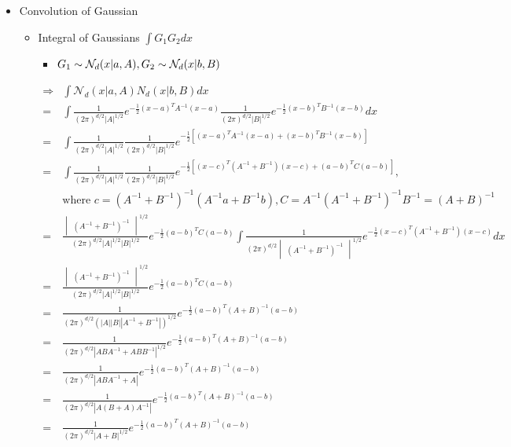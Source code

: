 \begin{itemize}
 	\item Convolution of Gaussian
 		\begin{itemize}
 		\item Integral of Gaussians $\int G_1G_2dx$
 			\begin{itemize}
 			\item $G_1\sim \mathcal N_d(x|a,A), \space G_2 \sim \mathcal N_d(x|b,B)$
 			\end{itemize}
 			\begin{align*} \displaystyle \Rightarrow & \int \mathcal N_d(x|a,A) N_d(x|b,B)dx \\ = & \int \frac 1 {(2\pi)^{d/2} |A|^{1/2}} e^{-\frac 1 2 (x-a)^TA^{-1}(x-a)} \frac 1 {(2\pi)^{d/2}|B|^{1/2}} e^{-\frac 1 2 (x-b)^TB^{-1}(x-b)} dx \\ = & \int \frac 1 {(2\pi)^{d/2} |A|^{1/2}} \frac 1 {(2\pi)^{d/2}|B|^{1/2}} e^{-\frac 12 [(x-a)^TA^{-1}(x-a)+(x-b)^TB^{-1}(x-b)]} \\ = & \int \frac 1 {(2\pi)^{d/2} |A|^{1/2}} \frac 1 {(2\pi)^{d/2}|B|^{1/2}}  e^{-\frac 12 [(x-c)^T (A^{-1}+B^{-1}) (x-c)+(a-b)^TC(a-b)]},\\ & \text{where } c=(A^{-1}+B^{-1})^{-1}(A^{-1}a+B^{-1}b), C=A^{-1}(A^{-1}+B^{-1})^{-1}B^{-1} = (A+B)^{-1} \\ = & \frac {\begin{vmatrix}(A^{-1}+B^{-1})^{-1}\end{vmatrix}^{1/2}} {(2\pi)^{d/2}|A|^{1/2}|B|^{1/2}} e^{-\frac 12 (a-b)^TC(a-b)} \int \frac 1 {(2\pi)^{d/2}\begin{vmatrix}(A^{-1}+B^{-1})^{-1}\end{vmatrix}^{1/2}} e^{-\frac 12 (x-c)^T(A^{-1}+B^{-1}) (x-c)} dx \\ =& \frac {\begin{vmatrix}(A^{-1}+B^{-1})^{-1}\end{vmatrix}^{1/2}} {(2\pi)^{d/2}|A|^{1/2}|B|^{1/2}} e^{-\frac 12 (a-b)^TC(a-b)} \\ =& \frac 1 {(2\pi)^{d/2} (|A||B||A^{-1}+B^{-1}|)^{1/2}} e^{-\frac 12 (a-b)^T (A+B)^{-1} (a-b)} \\=& \frac 1 {(2\pi)^{d/2} |ABA^{-1}+ABB^{-1}|^{1/2}} e^{-\frac 12 (a-b)^T (A+B)^{-1} (a-b)} \\=& \frac 1 {(2\pi)^{d/2} |ABA^{-1}+A| } e^{-\frac 12 (a-b)^T (A+B)^{-1} (a-b)} \\=& \frac 1 {(2\pi)^{d/2} |A(B+A)A^{-1}| } e^{-\frac 12 (a-b)^T (A+B)^{-1} (a-b)} \\=& \frac 1 {(2\pi)^{d/2} |A+B|^{1/2} } e^{-\frac 12 (a-b)^T (A+B)^{-1} (a-b)} \end{align*}
 			

\end{itemize}
\end{itemize}
